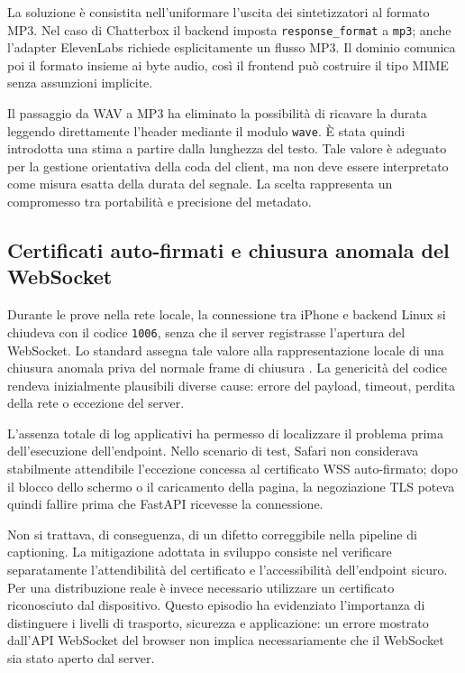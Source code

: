 La soluzione è consistita nell'uniformare l'uscita dei sintetizzatori al
formato MP3. Nel caso di Chatterbox il backend imposta
\texttt{response\_format} a \texttt{mp3}; anche l'adapter ElevenLabs richiede
esplicitamente un flusso MP3. Il dominio comunica poi il formato insieme ai
byte audio, così il frontend può costruire il tipo MIME senza assunzioni
implicite.

Il passaggio da WAV a MP3 ha eliminato la possibilità di ricavare la durata
leggendo direttamente l'header mediante il modulo \texttt{wave}. È stata
quindi introdotta una stima a partire dalla lunghezza del testo. Tale valore è
adeguato per la gestione orientativa della coda del client, ma non deve essere
interpretato come misura esatta della durata del segnale. La scelta rappresenta
un compromesso tra portabilità e precisione del metadato.

\subsection{Certificati auto-firmati e chiusura anomala del WebSocket}
\label{subsec:problemi-certificati}

Durante le prove nella rete locale, la connessione tra iPhone e backend Linux
si chiudeva con il codice \texttt{1006}, senza che il server registrasse
l'apertura del WebSocket. Lo standard assegna tale valore alla rappresentazione
locale di una chiusura anomala priva del normale frame di chiusura
\cite{fette2011websocket}. La genericità del codice rendeva inizialmente
plausibili diverse cause: errore del payload, timeout, perdita della rete o
eccezione del server.

L'assenza totale di log applicativi ha permesso di localizzare il problema
prima dell'esecuzione dell'endpoint. Nello scenario di test, Safari non
considerava stabilmente attendibile l'eccezione concessa al certificato WSS
auto-firmato; dopo il blocco dello schermo o il caricamento della pagina, la
negoziazione TLS poteva quindi fallire prima che FastAPI ricevesse la
connessione.

Non si trattava, di conseguenza, di un difetto correggibile nella pipeline di
captioning. La mitigazione adottata in sviluppo consiste nel verificare
separatamente l'attendibilità del certificato e l'accessibilità dell'endpoint
sicuro. Per una distribuzione reale è invece necessario utilizzare un
certificato riconosciuto dal dispositivo. Questo episodio ha evidenziato
l'importanza di distinguere i livelli di trasporto, sicurezza e applicazione:
un errore mostrato dall'API WebSocket del browser non implica necessariamente
che il WebSocket sia stato aperto dal server.

